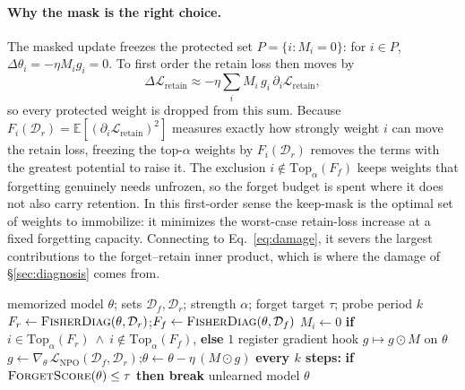 \documentclass[sigconf,nonacm]{acmart}
\begin{document}
\paragraph{Why the mask is the right choice.} The masked update freezes the protected set $P=\{i: M_i=0\}$: for $i\in P$, $\Delta\theta_i = -\eta M_i g_i = 0$. To first order the retain loss then moves by
\begin{equation}
\Delta\mathcal{L}_{\mathrm{retain}} \approx -\eta\sum_{i} M_i\, g_i\, \partial_i\mathcal{L}_{\mathrm{retain}},
\end{equation}
so every protected weight is dropped from this sum. Because $F_i(\mathcal{D}_r)=\mathbb{E}[(\partial_i\mathcal{L}_{\mathrm{retain}})^2]$ measures exactly how strongly weight $i$ can move the retain loss, freezing the top-$\alpha$ weights by $F_i(\mathcal{D}_r)$ removes the terms with the greatest potential to raise it. The exclusion $i\notin\mathrm{Top}_\alpha(F_f)$ keeps weights that forgetting genuinely needs unfrozen, so the forget budget is spent where it does not also carry retention. In this first-order sense the keep-mask is the optimal set of weights to immobilize: it minimizes the worst-case retain-loss increase at a fixed forgetting capacity. Connecting to Eq.~\eqref{eq:damage}, it severs the largest contributions to the forget--retain inner product, which is where the damage of \S\ref{sec:diagnosis} comes from.

\begin{algorithm}[t]
\caption{Fisher-Masked NPO}
\label{alg:fmnpo}
\small
\begin{algorithmic}[1]
\Require memorized model $\theta$; sets $\mathcal{D}_f,\mathcal{D}_r$; strength $\alpha$; forget target $\tau$; probe period $k$
\State $F_r \gets \textsc{FisherDiag}(\theta,\mathcal{D}_r)$;\quad $F_f \gets \textsc{FisherDiag}(\theta,\mathcal{D}_f)$ 
  \State $M_i \gets 0$ \textbf{if} $i\in\mathrm{Top}_\alpha(F_r)\ \wedge\ i\notin\mathrm{Top}_\alpha(F_f)$, \textbf{else} $1$
\EndFor
\State register gradient hook $g \mapsto g\odot M$ on $\theta$
\Repeat
  \State $g \gets \nabla_\theta\,\mathcal{L}_{\mathrm{NPO}}(\mathcal{D}_f,\mathcal{D}_r)$;\quad $\theta \gets \theta - \eta\,(M\odot g)$
  \State \textbf{every $k$ steps:} \textbf{if} $\textsc{ForgetScore}(\theta)\le\tau$ \textbf{then break}
\State \Return unlearned model $\theta$
\end{algorithmic}
\end{algorithm}
\end{document}
